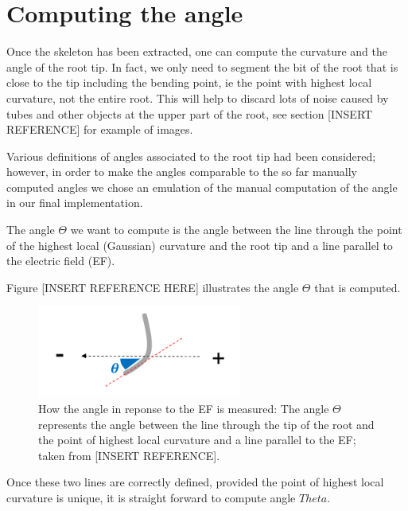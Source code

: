 \section{Computing the angle}

Once the skeleton has been extracted, one can compute the curvature and the angle of the root tip. 
In fact, we only need to segment the bit of the root that is close to the tip including the bending point, ie the point with highest local curvature, not the entire root. This will help to discard lots of noise caused by tubes and other objects at the upper part of the root, see section [INSERT REFERENCE] for example of images.

Various definitions of angles associated to the root tip had been considered; however, in order to make the angles comparable to the so far manually computed angles we chose an emulation of the manual computation of the angle in our final implementation. 



The angle \( \Theta \) we want to compute is the angle between the line through the point of the highest local (Gaussian) curvature and the root tip and a line parallel to the electric field (EF).  

Figure [INSERT REFERENCE HERE] illustrates the angle \( \Theta \) that is computed. 


\begin{figure}[h]
	\centering
	\includegraphics[width=0.6\textwidth]{../Figures/angle.png}
	\caption{How the angle in reponse to the EF is measured: The angle \( \Theta \) represents the angle between the line through the tip of the root and the point of highest local curvature and a line parallel to the EF; taken from [INSERT REFERENCE].}
	\label{fig:angle}
\end{figure}



Once these two lines are correctly defined, provided the point of highest local curvature is unique, it is straight forward to compute angle \( Theta \).


